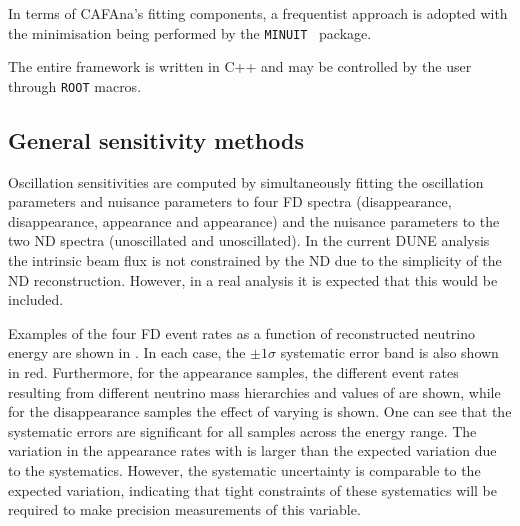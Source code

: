 In terms of CAFAna's fitting components, a frequentist approach is adopted with the minimisation being performed by the \texttt{MINUIT}~\cite{minuit} package.

The entire framework is written in C++ and may be controlled by the user through \texttt{ROOT} macros.

\subsection{General sensitivity methods}
\label{sec:dune_lbl:sensitivities:general}

Oscillation sensitivities are computed by simultaneously fitting the oscillation parameters and nuisance parameters to four FD spectra (\numu disappearance, \anumu disappearance, \nue appearance and \anue appearance) and the nuisance parameters to the two ND spectra (\numu unoscillated and \anumu unoscillated).
In the current DUNE analysis the intrinsic \nue beam flux is not constrained by the ND due to the simplicity of the ND reconstruction.
However, in a real analysis it is expected that this would be included.

Examples of the four FD event rates as a function of reconstructed neutrino energy are shown in .
In each case, the $\pm1\sigma$ systematic error band is also shown in red.
Furthermore, for the appearance samples, the different event rates resulting from different neutrino mass hierarchies and values of \dcp are shown, while for the disappearance samples the effect of varying  is shown.
One can see that the systematic errors are significant for all samples across the energy range.
The variation in the appearance rates with \dcp is larger than the expected variation due to the systematics.
However, the systematic uncertainty is comparable to the expected  variation, indicating that tight constraints of these systematics will be required to make precision measurements of this variable.

